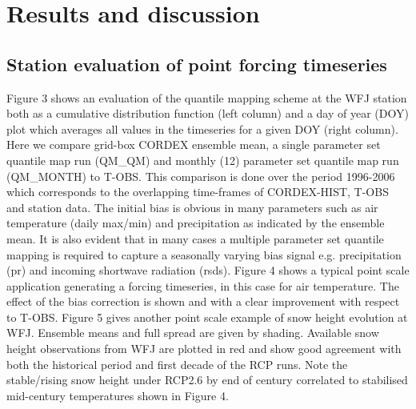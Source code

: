 \documentclass[hess, manuscript]{copernicus}
\begin{document}

 

\section{Results and discussion}


\subsection{Station evaluation of point forcing timeseries}

Figure 3 shows an evaluation of the quantile mapping scheme at the WFJ station both as a cumulative distribution function (left column) and a day of year (DOY) plot which averages all values in the timeseries for a given DOY (right column). Here we compare grid-box CORDEX ensemble mean, a single parameter set quantile map run (QM\_QM) and monthly (12) parameter set quantile map run (QM\_MONTH) to T-OBS. This comparison is done over the period 1996-2006 which corresponds to the overlapping time-frames of CORDEX-HIST, T-OBS and station data. The initial bias is obvious in many parameters such as air temperature (daily max/min) and precipitation as indicated by the ensemble mean. It is also evident that in many cases a multiple parameter set quantile mapping is required to capture a seasonally varying bias signal e.g. precipitation (pr) and incoming shortwave radiation (rsds). 
Figure 4 shows a typical point scale application generating a forcing timeseries, in this case for air temperature. The effect of the bias correction is shown and with a clear improvement with respect to T-OBS.
Figure 5 gives another point scale example of snow height evolution at WFJ. Ensemble means and full spread are given by shading. Available snow height observations from WFJ are plotted in red and show good agreement with both the historical period and first decade of the RCP runs. Note the stable/rising snow height under RCP2.6 by end of century correlated to stabilised mid-century temperatures shown in Figure 4.
\end{document}
